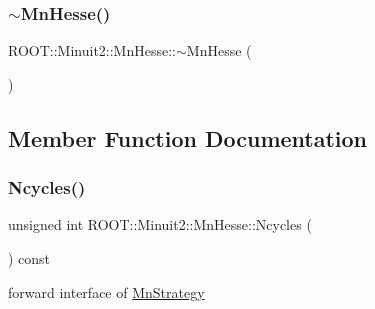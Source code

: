 \subsubsection{\texorpdfstring{$\sim$MnHesse()}{~MnHesse()}\hspace{0.1cm}{\footnotesize\ttfamily [3/3]}}
{\footnotesize\ttfamily R\+O\+O\+T\+::\+Minuit2\+::\+Mn\+Hesse\+::$\sim$\+Mn\+Hesse (\begin{DoxyParamCaption}{ }\end{DoxyParamCaption})\hspace{0.3cm}{\ttfamily [inline]}}



\subsection{Member Function Documentation}
\mbox{\label{classROOT_1_1Minuit2_1_1MnHesse_a5a84b9459469f2edf55f28d8d579a00d}} 
\subsubsection{\texorpdfstring{Ncycles()}{Ncycles()}\hspace{0.1cm}{\footnotesize\ttfamily [1/3]}}
{\footnotesize\ttfamily unsigned int R\+O\+O\+T\+::\+Minuit2\+::\+Mn\+Hesse\+::\+Ncycles (\begin{DoxyParamCaption}{ }\end{DoxyParamCaption}) const\hspace{0.3cm}{\ttfamily [inline]}}



forward interface of \mbox{\hyperlink{classROOT_1_1Minuit2_1_1MnStrategy}{Mn\+Strategy}} 

